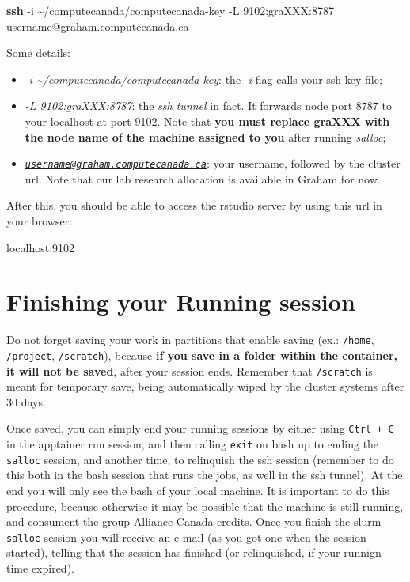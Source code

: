 \documentclass[
]{book}
\newenvironment{Shaded}{\begin{snugshade}}{\end{snugshade}}
\newcommand{\AttributeTok}[1]{\textcolor[rgb]{0.13,0.29,0.53}{#1}}
\newcommand{\ExtensionTok}[1]{#1}
\newcommand{\FunctionTok}[1]{\textcolor[rgb]{0.13,0.29,0.53}{\textbf{#1}}}
\newcommand{\NormalTok}[1]{#1}
\providecommand{\tightlist}{%
  \setlength{\itemsep}{0pt}\setlength{\parskip}{0pt}}
\begin{document}
\begin{Shaded}
\begin{Highlighting}[]
\FunctionTok{ssh} \AttributeTok{{-}i}\NormalTok{ \textasciitilde{}/computecanada/computecanada{-}key }\AttributeTok{{-}L}\NormalTok{ 9102:graXXX:8787 username@graham.computecanada.ca}
\end{Highlighting}
\end{Shaded}

Some details:

\begin{itemize}
\tightlist
\item
  \emph{-i \textasciitilde/computecanada/computecanada-key}: the \emph{-i} flag calls your ssh key file;
\item
  \emph{-L 9102:graXXX:8787}: the \emph{ssh tunnel} in fact. It forwards node port 8787 to your localhost at port 9102. Note that \textbf{you must replace graXXX with the node name of the machine assigned to you} after running \emph{salloc};
\item
  \emph{\href{mailto:username@graham.computecanada.ca}{\nolinkurl{username@graham.computecanada.ca}}}: your username, followed by the cluster url. Note that our lab research allocation is available in Graham for now.
\end{itemize}

After this, you should be able to access the rstudio server by using this url
in your browser:

\begin{Shaded}
\begin{Highlighting}[]
\ExtensionTok{localhost:9102}
\end{Highlighting}
\end{Shaded}

\hypertarget{finishing-your-running-session}{%
\section{Finishing your Running session}\label{finishing-your-running-session}}

Do not forget saving your work in partitions that enable saving (ex.: \texttt{/home}, \texttt{/project}, \texttt{/scratch}), because \textbf{if you save in a folder within the container, it will not be saved}, after your session ends. Remember that \texttt{/scratch} is meant for temporary save, being automatically wiped by the cluster systems after 30 days.

Once saved, you can simply end your running sessions by either using \texttt{Ctrl\ +\ C} in the apptainer run session, and then calling \texttt{exit} on bash up to ending the \texttt{salloc} session, and another time, to relinquish the ssh session (remember to do this both in the bash session that runs the jobs, as well in the ssh tunnel). At the end you will only see the bash of your local machine. It is important to do this procedure, because otherwise it may be possible that the machine is still running, and consument the group Alliance Canada credits. Once you finish the slurm \texttt{salloc} session you will receive an e-mail (as you got one when the session started), telling that the session has finished (or relinquished, if your runnign time expired).
\end{document}
